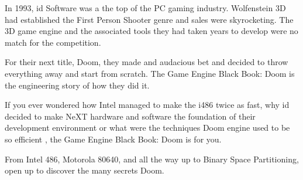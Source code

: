 In 1993, id Software was a the top of the PC gaming industry. Wolfenstein 3D had established the First
Person Shooter genre and sales were skyrocketing. The 3D game engine and the associated 
tools they had taken years to develop were no match for the competition.\\
\par
For their next title, Doom, they made and audacious bet and decided to throw everything 
away and start from scratch. The Game Engine Black Book: Doom is the engineering story
of how they did it.\\
\par
If you ever wondered how Intel managed to make the i486 twice as fast, why id decided to
make NeXT hardware and software the foundation of their development environment or what 
were the techniques Doom engine used to be so efficient , the Game Engine Black Book: Doom
 is for you.\\
\par
From Intel 486, Motorola 80640, and all the way up to Binary Space Partitioning, open up to
discover the many secrets Doom.\\
\par 
